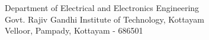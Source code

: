 \large Department of Electrical and Electronics Engineering\\
\large Govt. Rajiv Gandhi Institute of Technology, Kottayam\\
\large Velloor, Pampady, Kottayam - 686501\\
